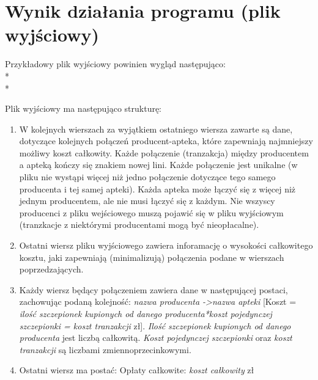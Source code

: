 \documentclass[11pt]{article}
\begin{document}
\section{Wynik działania programu (plik wyjściowy)}
Przykładowy plik wyjściowy powinien wygląd następująco:\\*\\*

\vspace{1em}
Plik wyjściowy ma następująco strukturę:
\begin{enumerate}
    \item W kolejnych wierszach za wyjątkiem ostatniego wiersza zawarte są dane, dotyczące kolejnych połączeń producent-apteka, które zapewniają najmniejszy możliwy koszt całkowity. Każde połączenie (tranzakcja) między producentem a apteką kończy się znakiem nowej lini. Każde połączenie jest unikalne (w pliku nie wystąpi więcej niż jedno połączenie dotyczące tego samego producenta i tej samej apteki). Każda apteka może łączyć się z więcej niż jednym producentem, ale nie musi łączyć się z każdym. Nie wszyscy producenci z pliku wejściowego muszą pojawić się w pliku wyjściowym (tranzkacje z niektórymi producentami mogą być nieopłacalne).
    \item Ostatni wiersz pliku wyjściowego zawiera inforamację o wysokości całkowitego kosztu, jaki zapewniają (minimalizują) połączenia podane w wierszach poprzedzających. 
    \item Każdy wiersz będący połączeniem zawiera dane w następującej postaci, zachowując podaną kolejność: \emph{nazwa producenta -\textgreater\space nazwa apteki} [Koszt = \emph{ilość szczepionek kupionych od danego producenta*koszt pojedynczej szczepionki = koszt tranzakcji} zł]. \emph{Ilość szczepionek kupionych od danego producenta} jest liczbą całkowitą. \emph{Koszt pojedynczej szczepionki} oraz \emph{koszt tranzakcji} są liczbami zmiennoprzecinkowymi.
    \item Ostatni wiersz ma postać: Opłaty całkowite: \emph{koszt całkowity} zł
\end{enumerate}
\end{document}
